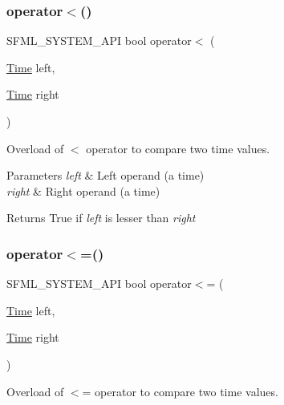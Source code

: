 \subsubsection{\texorpdfstring{operator$<$()}{operator<()}}
{\footnotesize\ttfamily S\+F\+M\+L\+\_\+\+S\+Y\+S\+T\+E\+M\+\_\+\+A\+PI bool operator$<$ (\begin{DoxyParamCaption}\item[{\mbox{\hyperlink{classsf_1_1_time}{Time}}}]{left,  }\item[{\mbox{\hyperlink{classsf_1_1_time}{Time}}}]{right }\end{DoxyParamCaption})\hspace{0.3cm}{\ttfamily [related]}}



Overload of $<$ operator to compare two time values. 


\begin{DoxyParams}{Parameters}
{\em left} & Left operand (a time) \\
\hline
{\em right} & Right operand (a time)\\
\hline
\end{DoxyParams}
\begin{DoxyReturn}{Returns}
True if {\itshape left} is lesser than {\itshape right} \begin{DoxyVerb}\end{DoxyVerb}
 
\end{DoxyReturn}
\mbox{\label{classsf_1_1_time_a2c22369869bf903578635bc6517c44d4}} 
\subsubsection{\texorpdfstring{operator$<$=()}{operator<=()}}
{\footnotesize\ttfamily S\+F\+M\+L\+\_\+\+S\+Y\+S\+T\+E\+M\+\_\+\+A\+PI bool operator$<$= (\begin{DoxyParamCaption}\item[{\mbox{\hyperlink{classsf_1_1_time}{Time}}}]{left,  }\item[{\mbox{\hyperlink{classsf_1_1_time}{Time}}}]{right }\end{DoxyParamCaption})\hspace{0.3cm}{\ttfamily [related]}}



Overload of $<$= operator to compare two time values. 



